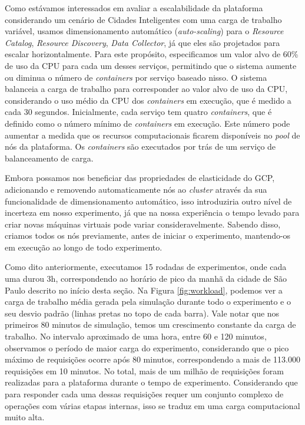 Como estávamos interessados em avaliar a escalabilidade da plataforma considerando um cenário de Cidades Inteligentes com uma carga de trabalho variável, usamos dimensionamento automático
(\textit{auto-scaling}) para o \textit{Resource Catalog}, \textit{Resource Discovery}, \textit{Data Collector}, já que eles são projetados para escalar horizontalmente.
Para este propósito, especificamos um valor alvo de 60\% de uso da CPU para cada um desses serviços, permitindo que o sistema aumente ou diminua o número de \textit{containers} por serviço baseado nisso.
O sistema balanceia a carga de trabalho para corresponder ao valor alvo de uso da CPU, considerando o uso médio da CPU dos \textit{containers} em execução, que é medido a cada 30 segundos.
Inicialmente, cada serviço tem quatro \textit{containers}, que é definido como o número mínimo de \textit{containers} em execução.
Este número pode aumentar a medida que os recursos computacionais ficarem disponíveis no \textit{pool} de nós da plataforma.
Os \textit{containers} são executados por trás de um serviço de balanceamento de carga.

Embora possamos nos beneficiar das propriedades de elasticidade do GCP, adicionando e removendo automaticamente nós ao \textit{cluster} através da sua funcionalidade de dimensionamento automático,
isso introduziria outro nível de incerteza em nosso experimento, já que na nossa experiência o tempo levado para criar novas máquinas virtuais pode variar consideravelmente.
Sabendo disso, criamos todos os nós previamente, antes de iniciar o experimento, mantendo-os em execução ao longo de todo experimento.

Como dito anteriormente, executamos 15 rodadas de experimentos, onde cada uma durou 3h, correspondendo ao horário de pico da manhã da cidade de São Paulo descrito no início desta seção.
Na Figura \ref{fig:workload}, podemos ver a carga de trabalho média gerada pela simulação durante todo o experimento e o seu desvio padrão (linhas pretas no topo de cada barra).
Vale notar que nos primeiros 80 minutos de simulação, temos um crescimento constante da carga de trabalho.
No intervalo aproximado de uma hora, entre 60 e 120 minutos, observamos o período de maior carga do experimento, considerando que o pico máximo de requisições ocorre após 80 minutos, correspondendo a mais
de 113.000 requisições em 10 minutos.
No total, mais de um milhão de requisições foram realizadas para a plataforma durante o tempo de experimento.
Considerando que para responder cada uma dessas requisições requer um conjunto complexo de operações com várias etapas internas, isso se traduz em uma carga computacional muito alta.

